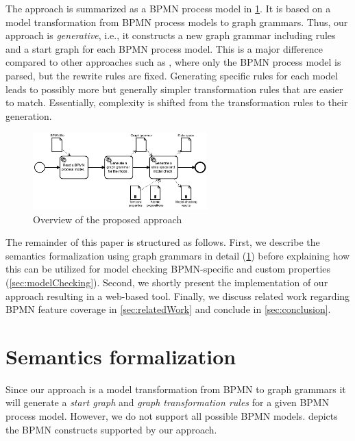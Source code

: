 \documentclass[adraft, copyright, creativecommons]{eptcs} %
\begin{document}
The approach is summarized as a BPMN process model in \cref{fig:approach}.
It is based on a model transformation from BPMN process models to graph grammars.
Thus, our approach is \textit{generative}, i.e., it constructs a new graph grammar including rules and a start graph for each BPMN process model.
This is a major difference compared to other approaches such as \cite{corradiniFormalApproachAnalysis2021, vangorpVisualTokenbasedFormalization2013}, where only the BPMN process model is parsed, but the rewrite rules are fixed.
Generating specific rules for each model leads to possibly more but generally simpler transformation rules that are easier to match.
Essentially, complexity is shifted from the transformation rules to their generation.

\begin{figure}[h]
    \centering
    \includegraphics[width=0.6\textwidth]{images/full-approach.pdf}
    \caption{Overview of the proposed approach}
    \label{fig:approach}
\end{figure}

The remainder of this paper is structured as follows.
First, we describe the semantics formalization using graph grammars in detail (\cref{sec:formalization}) before explaining how this can be utilized for model checking BPMN-specific and custom properties (\cref{sec:modelChecking}).
Second, we shortly present the implementation of our approach resulting in a web-based tool.
Finally, we discuss related work regarding BPMN feature coverage in \cref{sec:relatedWork} and conclude in \cref{sec:conclusion}.

\section{Semantics formalization} \label{sec:formalization}

Since our approach is a model transformation from BPMN to graph grammars it will generate a \emph{start graph} and \emph{graph transformation rules} for a given BPMN process model.
However, we do not support all possible BPMN models.
 depicts the BPMN constructs supported by our approach.
\end{document}
